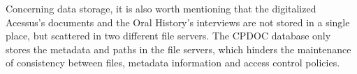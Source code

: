 
Concerning data storage, it is also worth mentioning that the
digitalized Acessus's documents and the Oral History's interviews are
not stored in a single place, but scattered in two different file
servers. The CPDOC database only stores the metadata and paths in the
file servers, which hinders the maintenance of consistency between
files, metadata information and access control policies.


